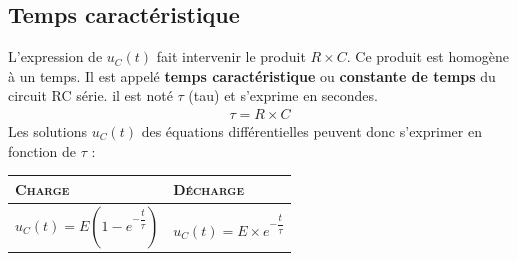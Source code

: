 \documentclass[a4paper,11pt,fleqn]{article}%
\begin{document}
	\subsection{Temps caractéristique}
	L'expression de $u_C(t)$ fait intervenir le produit $R\times C$. Ce produit est homogène à un temps. Il est appelé \textbf{temps caractéristique} ou \textbf{constante de temps} du circuit RC série. il est noté $\tau$ (tau) et s'exprime en secondes.
	\begin{eqnarray}
		\tau = R\times C\nonumber
	\end{eqnarray}
	Les solutions $u_C(t)$ des équations différentielles peuvent donc s'exprimer en fonction de $\tau$ :\\
	\begin{table}[h!]
		\centering \begin{tabular}{|>{\centering}m{5cm}|>{\centering\arraybackslash}m{5cm}|}
		\hline \textbf{\textsc{Charge}} & \textbf{\textsc{Décharge}}\\
		\hline $u_C(t)=E\left(1-e^{-\dfrac{t}{\tau}}\right)$ & $u_C(t)=E\times e^{-\dfrac{t}{\tau}}$\\
		\hline
		\end{tabular}
	\end{table}
\end{document}
